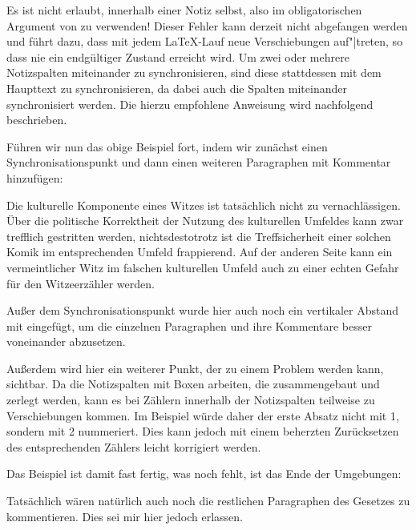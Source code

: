 Es ist nicht erlaubt,  innerhalb
einer Notiz selbst, also im obligatorischen Argument von
 zu verwenden! Dieser Fehler kann derzeit
nicht abgefangen werden und führt dazu, dass mit jedem \LaTeX-Lauf neue
Verschiebungen auf"|treten, so dass nie ein endgültiger Zustand erreicht
wird. Um zwei oder mehrere Notizspalten miteinander zu synchronisieren, sind
diese stattdessen mit dem Haupttext zu synchronisieren, da dabei auch die
Spalten miteinander synchronisiert werden. Die hierzu empfohlene Anweisung
wird nachfolgend beschrieben.%
%
\begin{Example}
  Führen wir nun das obige Beispiel fort, indem wir zunächst einen
  Synchronisationspunkt und dann einen weiteren Paragraphen
  mit Kommentar hinzufügen:
\begin{lstcode}
    \syncwithnotecolumn[paragraphs]\bigskip
    Die kulturelle Komponente eines Witzes ist 
    tatsächlich nicht zu vernachlässigen. Über die
    politische Korrektheit der Nutzung des
    kulturellen Umfeldes kann zwar trefflich 
    gestritten werden, nichtsdestotrotz ist die 
    Treffsicherheit einer solchen Komik im
    entsprechenden Umfeld frappierend. Auf der 
    anderen Seite kann ein vermeintlicher Witz im
    falschen kulturellen Umfeld auch zu einer 
    echten Gefahr für den Witzeerzähler werden.
\end{lstcode}
  Außer dem Synchronisationspunkt wurde hier auch noch ein vertikaler
  Abstand mit  eingefügt, um die einzelnen Paragraphen und ihre
  Kommentare besser voneinander abzusetzen.

  Außerdem wird hier ein weiterer Punkt, der zu einem
  Problem werden kann, sichtbar. Da die Notizspalten mit Boxen arbeiten, die
  zusammengebaut und zerlegt werden, kann es bei Zählern innerhalb der Notizspalten teilweise zu Verschiebungen
  kommen. Im Beispiel würde daher der erste Absatz nicht mit 1, sondern mit 2
  nummeriert. Dies kann jedoch mit einem beherzten Zurücksetzen des
  entsprechenden Zählers leicht korrigiert werden.

  Das Beispiel ist damit fast fertig, was noch fehlt, ist das Ende der
  Umgebungen:
\begin{lstcode}
  \end{addmargin}
  
\end{lstcode}
  Tatsächlich wären natürlich auch noch die restlichen Paragraphen des
  Gesetzes zu kommentieren. Dies sei mir hier jedoch erlassen.
\end{Example}%
